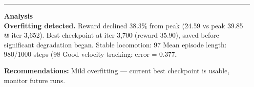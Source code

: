 \documentclass[a4paper,10pt]{article}
\begin{document}
\vspace{2pt}
\hrule
\vspace{2pt}

\footnotesize
\textbf{Analysis} \\[1pt]
\textbf{Overfitting detected.} Reward declined 38.3\% from peak (24.59 vs peak 39.85 @ iter 3,652).
Best checkpoint at iter 3,700 (reward 35.90), saved before significant degradation began.
Stable locomotion: 97%
Mean episode length: 980/1000 steps (98%
Good velocity tracking: error = 0.377.

\textbf{Recommendations:}
Mild overfitting --- current best checkpoint is usable, monitor future runs.
\end{document}

